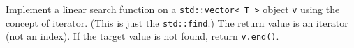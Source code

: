   Implement a linear search function on a \verb!std::vector< T >!
  object \verb!v! using the concept of iterator.
  (This is just the \verb!std::find!.)
  The return value is an iterator (not an index).
  If the target value is not found, return \verb!v.end()!.
